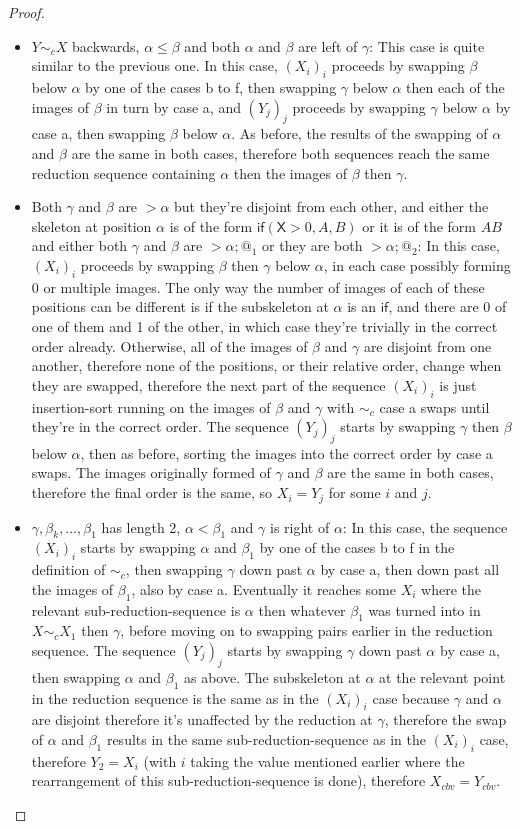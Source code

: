 \documentclass{article}
\newcommand{\tif}[3]{\mathsf{if}(#1, #2, #3)} %
\newcommand{\skeletonPlaceholder}{\mathsf{X}} %
\theoremstyle{definition}
\theoremstyle{lemma}
\theoremstyle{remark}
\begin{document}
\begin{proof}
\begin{itemize}
\item $Y \sim_c X$ backwards, $\alpha \leq \beta$ and both $\alpha$ and $\beta$ are left of $\gamma$: This case is quite similar to the previous one. In this case, $(X_i)_i$ proceeds by swapping $\beta$ below $\alpha$ by one of the cases b to f, then swapping $\gamma$ below $\alpha$ then each of the images of $\beta$ in turn by case a, and $(Y_j)_j$ proceeds by swapping $\gamma$ below $\alpha$ by case a, then swapping $\beta$ below $\alpha$. As before, the results of the swapping of $\alpha$ and $\beta$ are the same in both cases, therefore both sequences reach the same reduction sequence containing $\alpha$ then the images of $\beta$ then $\gamma$.
  \item Both $\gamma$ and $\beta$ are $> \alpha$ but they're disjoint from each other, and either the skeleton at position $\alpha$ is of the form $\tif{\skeletonPlaceholder > 0}{A}{B}$ or it is of the form $A B$ and either both $\gamma$ and $\beta$ are $> \alpha;@_1$ or they are both $> \alpha;@_2$: In this case, $(X_i)_i$ proceeds by swapping $\beta$ then $\gamma$ below $\alpha$, in each case possibly forming 0 or multiple images. The only way the number of images of each of these positions can be different is if the subskeleton at $\alpha$ is an $\textsf{if}$, and there are 0 of one of them and 1 of the other, in which case they're trivially in the correct order already. Otherwise, all of the images of $\beta$ and $\gamma$ are disjoint from one another, therefore none of the positions, or their relative order, change when they are swapped, therefore the next part of the sequence $(X_i)_i$ is just insertion-sort running on the images of $\beta$ and $\gamma$ with $\sim_c$ case a swaps until they're in the correct order. The sequence $(Y_j)_j$ starts by swapping $\gamma$ then $\beta$ below $\alpha$, then as before, sorting the images into the correct order by case a swaps. The images originally formed of $\gamma$ and $\beta$ are the same in both cases, therefore the final order is the same, so $X_i = Y_j$ for some $i$ and $j$.
  \item $\gamma, \beta_k, \dots, \beta_1$ has length 2, $\alpha < \beta_1$ and $\gamma$ is right of $\alpha$: In this case, the sequence $(X_i)_i$ starts by swapping $\alpha$ and $\beta_1$ by one of the cases b to f in the definition of $\sim_c$, then swapping $\gamma$ down past $\alpha$ by case a, then down past all the images of $\beta_1$, also by case a. Eventually it reaches some $X_i$ where the relevant sub-reduction-sequence is $\alpha$ then whatever $\beta_1$ was turned into in $X \sim_c X_1$ then $\gamma$, before moving on to swapping pairs earlier in the reduction sequence. The sequence $(Y_j)_j$ starts by swapping $\gamma$ down past $\alpha$ by case a, then swapping $\alpha$ and $\beta_1$ as above. The subskeleton at $\alpha$ at the relevant point in the reduction sequence is the same as in the $(X_i)_i$ case because $\gamma$ and $\alpha$ are disjoint therefore it's unaffected by the reduction at $\gamma$, therefore the swap of $\alpha$ and $\beta_1$ results in the same sub-reduction-sequence as in the $(X_i)_i$ case, therefore $Y_2 = X_i$ (with $i$ taking the value mentioned earlier where the rearrangement of this sub-reduction-sequence is done), therefore $X_{cbv} = Y_{cbv}$.

\end{itemize}
\end{proof}
\end{document}
